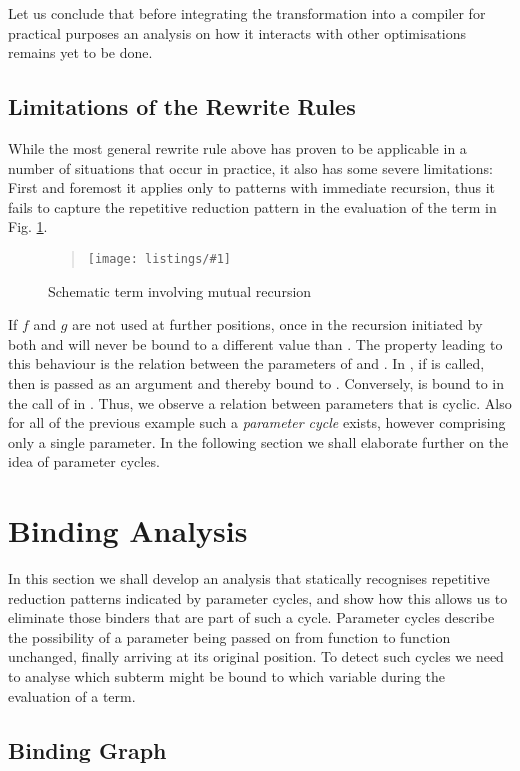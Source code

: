 \documentclass[submission,copyright,creativecommons]{eptcs}
\newcommand\listing[1]{\begin{quotation}\noindent\texttt{[image: listings/\#1]}\end{quotation}}
\newcommand\haskell[1]{\ensuremath{\mathit{#1}}}
\renewcommand\;{\,}
\begin{document}
Let us conclude that before integrating the transformation into a compiler for
practical purposes an analysis on how it interacts with other optimisations
remains yet to be done. 

\subsection{Limitations of the Rewrite Rules}


While the most general rewrite rule above has proven to be applicable in a number of situations
that occur in practice, it also has some severe limitations: 
First and foremost it applies only to patterns with immediate recursion, thus
it fails to capture the repetitive reduction pattern in the evaluation of
the term in Fig. \ref{mutual}.
\begin{figure}[h]
\listing{mutual}
\caption{\label{mutual}Schematic term involving mutual recursion}
\end{figure}
If \haskell{f} and \haskell{g} are not used at further positions, once in the
recursion initiated by  both  and  will never be bound to a
different value than . The property leading to this behaviour is the
relation between the parameters of  and . In , if  is called, then  is
passed as an argument and thereby bound to . Conversely,  is bound to 
in the call of  in . Thus, we observe a relation between parameters that
is cyclic. Also for all of the previous example such a {\it parameter cycle}
exists, however comprising only a single parameter. In the following section we
shall elaborate further on the idea of parameter cycles.

\section{Binding Analysis}\label{sec:binding:analysis}


In this section we shall develop an analysis that statically recognises
repetitive reduction patterns indicated by parameter cycles, and show how this
allows us to eliminate those binders that are part of such a cycle. Parameter
cycles describe the possibility of a parameter being passed on from function to
function unchanged, finally arriving at its original position. To detect such
cycles we need to analyse which subterm might be bound to which variable during
the evaluation of a term.





\subsection{Binding Graph}
\end{document}

